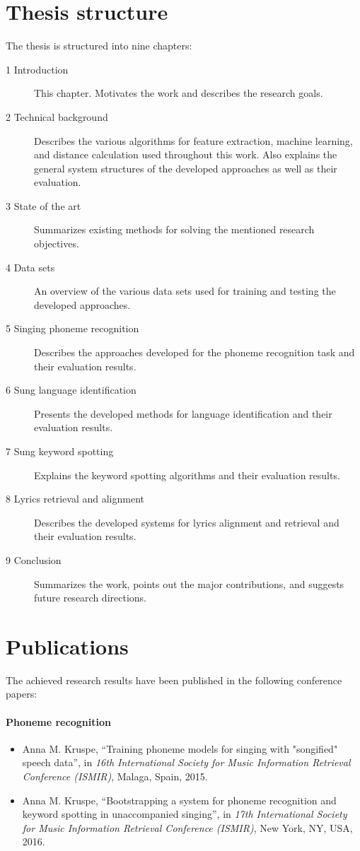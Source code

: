 \section{Thesis structure}
The thesis is structured into nine chapters:
\begin{description}
\item[1 Introduction] This chapter. Motivates the work and describes the research goals.
\item[2 Technical background] Describes the various algorithms for feature extraction, machine learning, and distance calculation used throughout this work. Also explains the general system structures of the developed approaches as well as their evaluation.
\item[3 State of the art] Summarizes existing methods for solving the mentioned research objectives.
\item[4 Data sets] An overview of the various data sets used for training and testing the developed approaches.
\item[5 Singing phoneme recognition] Describes the approaches developed for the phoneme recognition task and their evaluation results.
\item[6 Sung language identification] Presents the developed methods for language identification and their evaluation results.
\item[7 Sung keyword spotting] Explains the keyword spotting algorithms and their evaluation results.
\item[8 Lyrics retrieval and alignment] Describes the developed systems for lyrics alignment and retrieval and their evaluation results.
\item[9 Conclusion] Summarizes the work, points out the major contributions, and suggests future research directions.
\end{description}


\section{Publications}
The achieved research results have been published in the following conference papers:

\paragraph{Phoneme recognition}
\begin{itemize}
\item Anna M. Kruspe, ``Training phoneme models for singing with "songified" speech data'', in \textit{16th International Society for Music Information Retrieval Conference (ISMIR)}, Malaga, Spain, 2015.
\item Anna M. Kruspe, ``Bootstrapping a system for phoneme recognition and keyword spotting in unaccompanied singing'', in \textit{17th International Society for Music Information Retrieval Conference (ISMIR)}, New York, NY, USA, 2016.
\end{itemize}

